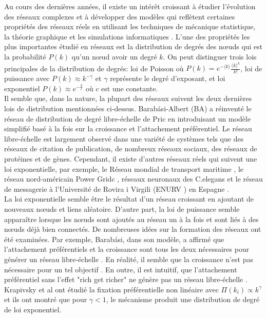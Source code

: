 Au cours des dernières années, il existe un intérêt croissant à étudier l'évolution des réseaux complexes et à développer des modèles qui reflètent certaines propriétés des réseaux réels en utilisant les techniques de mécanique statistique, la théorie graphique et les simulations informatiques \cite{BA1999,AB2002,Dorogovtsev-Mendes2002,Newman2003}. L'une des propriétés les plus importantes étudié en réseaux est la distribution de degrés des nœuds qui est la probabilité $P(k)$ qu'un nœud avoir un degré $k$.
On peut distinguer trois lois principales de la distribution de degrés: loi de Poisson où $P(k)=e^{-\langle k\rangle}\frac{\langle k\rangle^k}{k!}$, loi de puissance avec $P(k)\approx k^{-\gamma}$ et $\gamma$ représente le degré d'exposant, et loi exponentiel $P(k)\approx e^{-\frac{k}{c}}$ où $c$ est une constante.\\
Il semble que, dans la nature, la plupart des réseaux suivent les deux dernières lois de distribution mentionnées ci-dessus. Barab\'{a}si-Albert (BA) a réinventé le réseau de distribution de degré libre-échelle de Pric en introduisant un modèle simplifié basé à la fois sur la croissance et l'attachement préférentiel. Le réseau libre-échelle est largement observé dans une variété de systèmes tels que des réseaux de citation de publication, de nombreux réseaux sociaux, des réseaux de protéines et de gènes. Cependant, il existe d'autres réseaux réels qui suivent une loi exponentielle, par exemple, le Réseau mondial de transport maritime \cite{ Deng-al2009}, le réseau nord-américain Power Gridc \cite{Albert-al2004}, réseaux neuronaux des C.elegans \cite{Achacoso-Yamamoto1992} et le réseau de messagerie à l'Université de Rovira i Virgili (ENURV ) en Espagne \cite{Albert-al2004}.\\
La loi exponentielle semble être le résultat d'un réseau croissant en ajoutant de nouveaux nœuds et liens aléatoire. D'autre part, la loi de puissance semble apparaître lorsque les nœuds sont ajoutés au réseau un à la fois et sont liés à des nœuds déjà bien connectés.
De nombreuses idées sur la formation des réseaux ont été examinées. Par exemple, Barab\'{a}si, dans son modèle, a affirmé que l'attachement préférentiels et la croissance sont tous les deux nécessaires pour générer un réseau libre-échelle \cite{BA-al1999}. En réalité, il semble que la croissance n'est pas nécessaire pour un tel objectif \cite{Xie-al2008}. En outre, il est intuitif, que l'attachement préférentiel sans l'effet "rich get richer" ne génère pas un réseau libre-échelle \cite{Samalam}. Krapivsky et al \cite{Krapivsky-al2000} ont étudié la fixation préférentielle non linéaire avec $\Pi(k_i)\varpropto k^{\gamma}$ et ils ont montré que pour $\gamma<1$, le mécanisme produit une distribution de degré de loi exponentiel.

